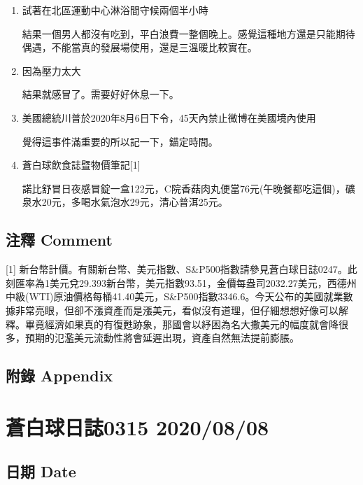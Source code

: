 \documentclass[a5paper, 11pt
]{book}
\begin{document}
\begin{enumerate}
\def\labelenumi{\arabic{enumi}.}
\item
  試著在北區運動中心淋浴間守候兩個半小時

  結果一個男人都沒有吃到，平白浪費一整個晚上。感覺這種地方還是只能期待偶遇，不能當真的發展場使用，還是三溫暖比較實在。
\item
  因為壓力太大

  結果就感冒了。需要好好休息一下。
\item
  美國總統川普於2020年8月6日下令，45天內禁止微博在美國境內使用

  覺得這事件滿重要的所以記一下，錨定時間。
\item
  蒼白球飲食誌暨物價筆記{[}1{]}

  諾比舒冒日夜感冒錠一盒122元，C院香菇肉丸便當76元(午晚餐都吃這個)，礦泉水20元，多喝水氣泡水29元，清心普洱25元。
\end{enumerate}

\hypertarget{ux6ce8ux91cb-comment-58}{%
\subsection{注釋 Comment}\label{ux6ce8ux91cb-comment-58}}

{[}1{]}
新台幣計價。有關新台幣、美元指數、S\&P500指數請參見蒼白球日誌0247。此刻匯率為1美元兌29.393新台幣，美元指數93.51，金價每盎司2032.27美元，西德州中級(WTI)原油價格每桶41.40美元，S\&P500指數3346.6。今天公布的美國就業數據非常亮眼，但卻不漲資產而是漲美元，看似沒有道理，但仔細想想好像可以解釋。畢竟經濟如果真的有復甦跡象，那國會以紓困為名大撒美元的幅度就會降很多，預期的氾濫美元流動性將會延遲出現，資產自然無法提前膨脹。

\hypertarget{ux9644ux9304-appendix-58}{%
\subsection{附錄 Appendix}\label{ux9644ux9304-appendix-58}}

\hypertarget{ux84bcux767dux7403ux65e5ux8a8c0315-20200808}{%
\section{蒼白球日誌0315
2020/08/08}\label{ux84bcux767dux7403ux65e5ux8a8c0315-20200808}}

\hypertarget{ux65e5ux671f-date-59}{%
\subsection{日期 Date}\label{ux65e5ux671f-date-59}}
\end{document}
